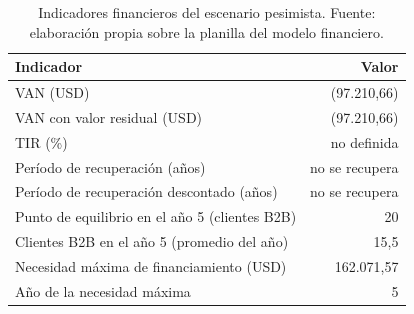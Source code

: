 \begin{table}[t]
  \centering
  \small
  \caption{Indicadores financieros del escenario pesimista. Fuente: elaboración propia sobre la planilla del modelo financiero.}
  \label{tab:financiero-pesimista-indicadores}
  \begin{tabular}{l r}
    \hline
    \textbf{Indicador} & \textbf{Valor} \\
    \hline
    VAN (USD) & (97.210,66) \\
    VAN con valor residual (USD) & (97.210,66) \\
    TIR (\%) & no definida \\
    Período de recuperación (años) & no se recupera \\
    Período de recuperación descontado (años) & no se recupera \\
    Punto de equilibrio en el año 5 (clientes B2B) & 20 \\
    Clientes B2B en el año 5 (promedio del año) & 15,5 \\
    Necesidad máxima de financiamiento (USD) & 162.071,57 \\
    Año de la necesidad máxima & 5 \\
    \hline
  \end{tabular}
\end{table}
